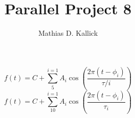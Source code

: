 \documentclass[]{article}
\title{Parallel Project 8}
\author{Mathias D. Kallick}
\begin{document}
	
\[
f(t) = C + \sum_{5}^{i=1} A_i \cos(\frac{2 \pi (t - \phi_i)}{\tau/i})
\]
\[
f(t) = C + \sum_{10}^{i=1} A_i \cos(\frac{2 \pi (t - \phi_i)}{\tau_i})
\]
\end{document}
